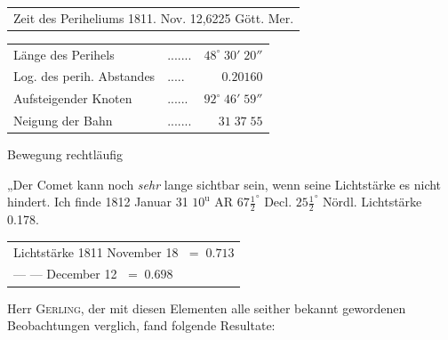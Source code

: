 \begin{center}\fontsize{10}{12}\selectfont\setlength{\tabcolsep}{4pt}\renewcommand{\arraystretch}{1.15}\begin{tabular}{l}
Zeit des Periheliums 1811. Nov. 12,6225 Gött. Mer.\\
\end{tabular}\end{center}
\begin{center}\fontsize{10}{12}\selectfont\setlength{\tabcolsep}{3pt}\renewcommand{\arraystretch}{1.15}\begin{tabular}{llr}
Länge des Perihels & .\;.\;.\;.\;.\;.\;. & $48^\circ\;30'\;20''$\\
Log. des perih. Abstandes & .\;.\;.\;.\;. & $0.20160$\\
Aufsteigender Knoten & .\;.\;.\;.\;.\;. & $92^\circ\;46'\;59''$\\
Neigung der Bahn & .\;.\;.\;.\;.\;.\;. & $31\;37\;55$\\
\end{tabular}\end{center}
\noindent Bewegung rechtläufig


\par\indent „Der Comet kann noch \emph{sehr} lange sichtbar sein, wenn seine Lichtstärke es nicht hindert. Ich finde 1812 Januar 31 $10^{\mathrm u}$ AR $67\frac{1}{2}^\circ$ Decl. $25\frac{1}{2}^\circ$ Nördl. Lichtstärke 0.178.

\begin{center}
\begin{tabular}{l}
Lichtstärke 1811 November 18 $\;=\;0.713$ \\
\qquad --- \qquad --- December 12 $\;=\;0.698$ \\
\end{tabular}
\end{center}


\par\indent Herr \textsc{Gerling}, der mit diesen Elementen alle seither bekannt gewordenen Beobachtungen verglich, fand folgende Resultate:

